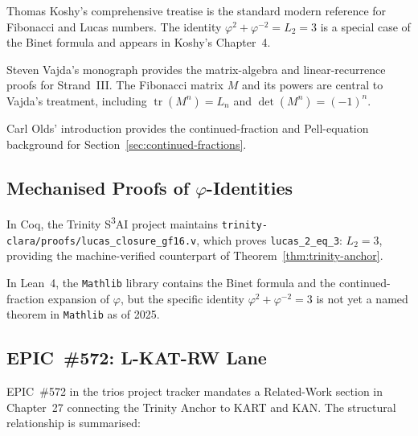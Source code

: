 Thomas Koshy's comprehensive treatise \cite{koshy_fib_lucas}
is the standard modern reference for Fibonacci and Lucas numbers.
The identity $\varphi^{2}+\varphi^{-2}=L_{2}=3$ is a special
case of the Binet formula and appears in Koshy's Chapter~4.

Steven Vajda's monograph \cite{vajda_fib_lucas} provides the
matrix-algebra and linear-recurrence proofs for Strand~III.
The Fibonacci matrix $M$ and its powers are central to Vajda's
treatment, including $\operatorname{tr}(M^{n})=L_{n}$ and
$\det(M^{n})=(-1)^{n}$.

Carl Olds' introduction \cite{olds_pell} provides the
continued-fraction and Pell-equation background for
Section~\ref{sec:continued-fractions}.

\subsection{Mechanised Proofs of $\varphi$-Identities}

In Coq, the Trinity S\textsuperscript{3}AI project maintains
\texttt{trinity-clara/proofs/lucas\_closure\_gf16.v},
which proves \texttt{lucas\_2\_eq\_3}: $L_{2}=3$, providing the
machine-verified counterpart of Theorem~\ref{thm:trinity-anchor}.

In Lean~4, the \texttt{Mathlib} library contains the Binet formula
and the continued-fraction expansion of $\varphi$, but the
specific identity $\varphi^{2}+\varphi^{-2}=3$ is not yet
a named theorem in \texttt{Mathlib} as of 2025.

\subsection{EPIC~\#572: L-KAT-RW Lane}

EPIC~\#572 in the trios project tracker mandates a
Related-Work section in Chapter~27 connecting the Trinity
Anchor to KART and KAN.
The structural relationship is summarised:

\begin{center}
\end{center}

